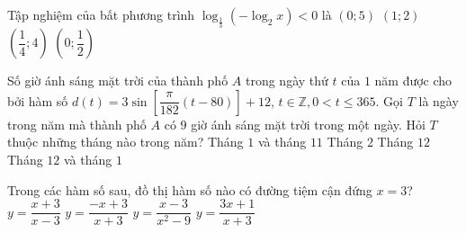 \begin{ex}%
Tập nghiệm của bất phương trình $\log_{\frac{1}{3}}\left(-\log_2x\right)<0$ là
\choice
{$(0;5)$}
{$(1;2)$}
{$\left(\dfrac{1}{4};4\right)$}
{\True $\left(0;\dfrac{1}{2}\right)$}
\end{ex}
\begin{ex}%
Số giờ ánh sáng mặt trời của thành phố $A$ trong ngày thứ $t$ của $1$ năm được cho bởi hàm số $d(t)=3\sin\left[\dfrac{\pi}{182}\left(t-80\right)\right]+12$, $t\in\mathbb{Z},0<t\le 365$. Gọi $T$ là ngày trong năm mà thành phố $A$ có $9$ giờ ánh sáng mặt trời trong một ngày. Hỏi $T$ thuộc những tháng nào trong năm?
\choice
{Tháng $1$ và tháng $11$}
{Tháng $2$}
{\True Tháng $12$}
{Tháng $12$ và tháng $1$}
\end{ex}
\begin{ex}%
Trong các hàm số sau, đồ thị hàm số nào có đường tiệm cận đứng $x=3$?
\choice
{\True $y=\dfrac{x+3}{x-3}$}
{$y=\dfrac{-x+3}{x+3}$}
{$y=\dfrac{x-3}{x^2-9}$}
{$y=\dfrac{3x+1}{x+3}$}
\end{ex}

